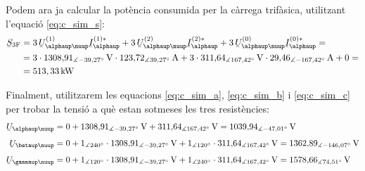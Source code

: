 \begin{exemple}
Podem ara ja calcular la pot\`{e}ncia consumida per la c\`{a}rrega
trif\`{a}sica, utilitzant l'equaci\'{o} \eqref{eq:c_sim_s}:
\[
\begin{split}
\cmplx{S}\ped{3F} &=  3\, \cmplx{U}_{\alphaup\nuup}^{(1)}
\cmplx{I}_\alphaup^{(1)*} + 3\, \cmplx{U}_{\alphaup\nuup}^{(2)}
\cmplx{I}_\alphaup^{(2)*} +  3\,
\cmplx{U}_{\alphaup\nuup}^{(0)}  \cmplx{I}_\alphaup^{(0)*} = \\
&= 3 \cdot 1308{,}91_{\measuredangle -39{,}27\degree}\unit{V} \cdot
123{,}72_{\measuredangle 39{,}27\degree}\unit{A} + 3 \cdot
311{,}64_{\measuredangle
167{,}42\degree}\unit{V} \cdot 29{,}46_{\measuredangle -167{,}42\degree}\unit{A} + 0 = \\
&= 513{,33}\unit{kW}
\end{split}
\]

Finalment, utilitzarem les equacions \eqref{eq:c_sim_a},
\eqref{eq:c_sim_b} i \eqref{eq:c_sim_c} per trobar la tensi\'{o} a qu\`{e}
estan sotmeses les tres resist\`{e}ncies:
\begin{align*}
    \cmplx{U}_{\alphaup\nuup} &= 0 + 1308{,}91_{\measuredangle -39{,}27\degree}\unit{V} +
    311{,}64_{\measuredangle 167{,}42\degree}\unit{V}  =
    1039{,}94_{\measuredangle -47{,}01\degree}\unit{V} \\[1ex]
    \cmplx{U}_{\betaup\nuup} &= 0 + 1_{\measuredangle 240\degree} \cdot
    1308{,}91_{\measuredangle -39{,}27\degree}\unit{V} +
    1_{\measuredangle 120\degree} \cdot
    311{,}64_{\measuredangle 167{,}42\degree}\unit{V}  =
    1362{,}89_{\measuredangle -146{,}07\degree}\unit{V}    \\[1ex]
    \cmplx{U}_{\gammaup\nuup} &= 0 + 1_{\measuredangle 120\degree} \cdot
    1308{,}91_{\measuredangle -39{,}27\degree}\unit{V} +
    1_{\measuredangle 240\degree} \cdot 311{,}64_{\measuredangle 167{,}42\degree}\unit{V}  =
    1578{,}66_{\measuredangle 74{,}51\degree}\unit{V}
\end{align*}
\end{exemple}
